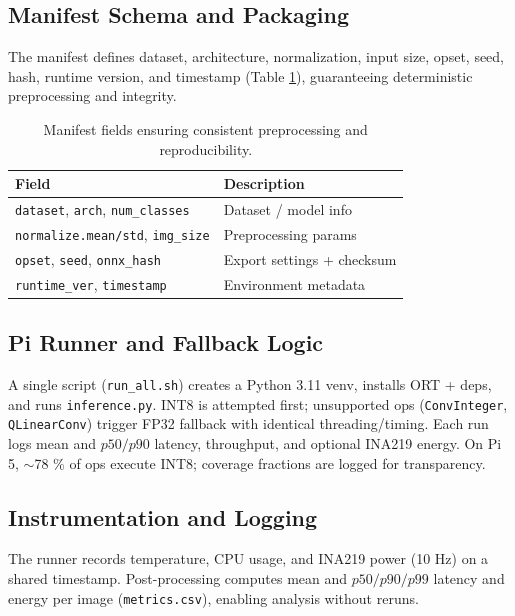 \documentclass{article}
\begin{document}
\subsection{Manifest Schema and Packaging}
The manifest defines dataset, architecture, normalization, input size, opset, seed, hash, runtime version, and timestamp (Table \ref{tab:manifest-schema}), guaranteeing deterministic preprocessing and integrity.

\begin{table}[h]
  \centering
  \small
  \begin{tabular}{p{3cm}p{4.8cm}}
    \toprule
    \textbf{Field} & \textbf{Description} \\
    \midrule
    \texttt{dataset}, \texttt{arch}, \texttt{num\_classes} & Dataset / model info \\
    \texttt{normalize.mean/std}, \texttt{img\_size} & Preprocessing params \\
    \texttt{opset}, \texttt{seed}, \texttt{onnx\_hash} & Export settings + checksum \\
    \texttt{runtime\_ver}, \texttt{timestamp} & Environment metadata \\
    \bottomrule
  \end{tabular}
  \caption{Manifest fields ensuring consistent preprocessing and reproducibility.}
  \label{tab:manifest-schema}
\end{table}

\subsection{Pi Runner and Fallback Logic}
A single script (\texttt{run\_all.sh}) creates a Python 3.11 venv, installs ORT + deps, and runs \texttt{inference.py}.  
INT8 is attempted first; unsupported ops (\texttt{ConvInteger}, \texttt{QLinearConv}) trigger FP32 fallback with identical threading/timing.  
Each run logs mean and $p50/p90$ latency, throughput, and optional INA219 energy.  
On Pi 5, $\sim$78 \% of ops execute INT8; coverage fractions are logged for transparency.

\subsection{Instrumentation and Logging}
The runner records temperature, CPU usage, and INA219 power (10 Hz) on a shared timestamp.  
Post-processing computes mean and $p50/p90/p99$ latency and energy per image (\texttt{metrics.csv}), enabling analysis without reruns.
\end{document}
